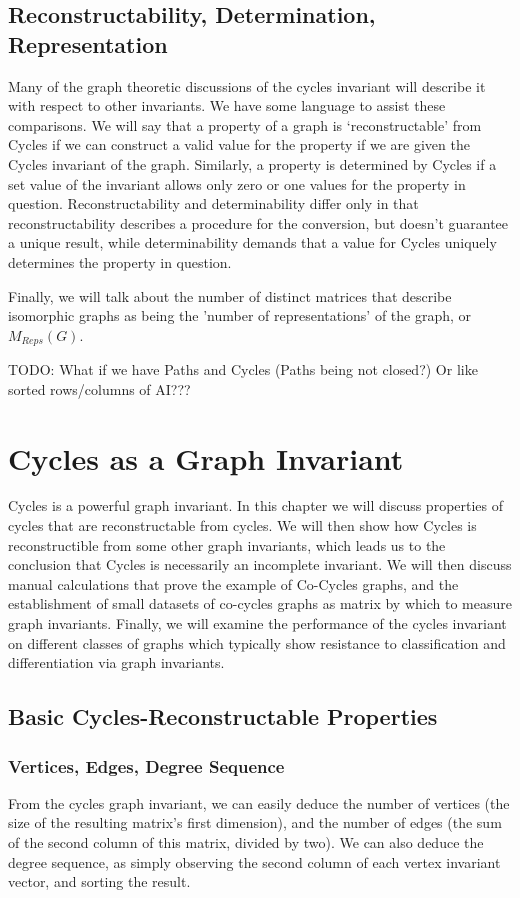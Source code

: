 \documentclass[11pt,a4paper]{report}
\begin{document}
\section{Reconstructability, Determination, Representation}
Many of the graph theoretic discussions of the cycles invariant will describe it with respect to other invariants. We have some language to assist these comparisons.
We will say that a property of a graph is `reconstructable' from Cycles if we can construct a valid value for the property if we are given the Cycles invariant of the graph.
Similarly, a property is determined by Cycles if a set value of the invariant allows only zero or one values for the property in question.
Reconstructability and determinability differ only in that reconstructability describes a procedure for the conversion, but doesn't guarantee a unique result, while determinability demands that a value for Cycles uniquely determines the property in question.

Finally, we will talk about the number of distinct matrices that describe isomorphic graphs as being the 'number of representations' of the graph, or $M_{Reps}(G)$.


TODO: What if we have Paths and Cycles (Paths being not closed?) Or like sorted rows/columns of AI???


\chapter{Cycles as a Graph Invariant}
Cycles is a powerful graph invariant.
In this chapter we will discuss properties of cycles that are reconstructable from cycles.
We will then show how Cycles is reconstructible from some other graph invariants, which leads us to the conclusion that Cycles is necessarily an incomplete invariant.
We will then discuss manual calculations that prove the example of Co-Cycles graphs, and the establishment of small datasets of co-cycles graphs as matrix by which to measure graph invariants.
Finally, we will examine the performance of the cycles invariant on different classes of graphs which typically show resistance to classification and differentiation via graph invariants.

\section{Basic Cycles-Reconstructable Properties}

\subsection{Vertices, Edges, Degree Sequence}
From the cycles graph invariant, we can easily deduce the number of vertices (the size of the resulting matrix's first dimension), and the number of edges (the sum of the second column of this matrix, divided by two).
We can also deduce the degree sequence, as simply observing the second column of each vertex invariant vector, and sorting the result.
\end{document}
